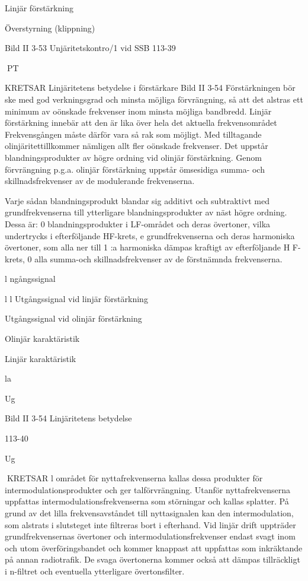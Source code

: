 {{{Linjär förstärkning

Överstyrning (klippning)

Bild II 3-53 Unjäritetskontro/1 vid SSB
113-39

PT

KRETSAR
Linjäritetens betydelse i förstärkare
Bild II 3-54
Förstärkningen bör ske med god verkningsgrad och minsta möjliga förvrängning, så att
det alstras ett minimum av oönskade frekvenser inom minsta möjliga bandbredd.
Linjär förstärkning innebär att den är lika
över hela det aktuella frekvensområdet Frekvensgången måste därför vara så rak som
möjligt. Med tilltagande olinjäritettillkommer
nämligen allt fler oönskade frekvenser.
Det uppstår blandningsprodukter av högre ordning vid olinjär förstärkning. Genom
förvrängning p.g.a. olinjär förstärkning uppstår ömsesidiga summa- och skillnadsfrekvenser av de modulerande frekvenserna.

Varje sådan blandningsprodukt blandar
sig additivt och subtraktivt med grundfrekvenserna till ytterligare blandningsprodukter
av näst högre ordning.
Dessa är:
0
blandningsprodukter i LF-området och
deras övertoner, vilka undertrycks i efterföljande HF-krets,
e
grundfrekvenserna och deras harmoniska
övertoner, som alla ner till 1 :a harmoniska dämpas kraftigt av efterföljande
H F-krets,
0
alla summa-och skillnadsfrekvenser av
de förstnämnda frekvenserna.

l ngångssignal

l  l 
Utgångssignal vid linjär förstärkning

Utgångssignal vid olinjär förstärkning

Olinjär karaktäristik

Linjär karaktäristik

la

Ug

Bild II 3-54 Linjäritetens betydelse

113-40

Ug

KRETSAR
l området för nyttafrekvenserna kallas
dessa produkter för intermodulationsprodukter och ger talförvrängning.
Utanför nyttafrekvenserna uppfattas
intermodulationsfrekvenserna som störningar och kallas splatter. På grund av det
lilla frekvensavståndet till nyttasignalen kan
den intermodulation, som alstrats i slutsteget
inte filtreras bort i efterhand.
Vid linjär drift uppträder grundfrekvensernas övertoner och intermodulationsfrekvenser endast svagt inom och utom överföringsbandet och kommer knappast att uppfattas som inkräktande på annan radiotrafik.
De svaga övertonerna kommer också att
dämpas tillräckligt i n-filtret och eventuella
ytterligare övertonsfilter.

}}}
